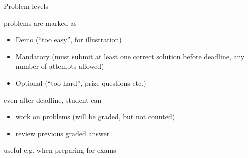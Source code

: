 \begin{slide}{Problem levels}

problems are marked as
\begin{itemize}
\item Demo (``too easy'', for illustration)
\item Mandatory (must submit at least one correct solution before deadline,
  any number of attempts allowed)
\item Optional (``too hard'', prize questions etc.)
\end{itemize}

even after deadline, student can
\begin{itemize}
\item
  work on problems (will be graded, but not counted)
\item
  review previous graded answer
\end{itemize}
useful e.g. when preparing for exams

\end{slide}
